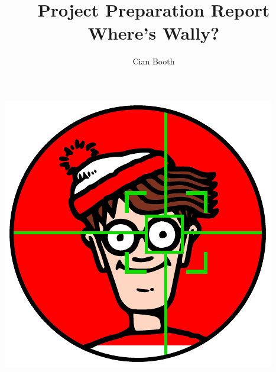 \documentclass[a4paper,12pt]{article}
\author{Cian Booth}
\title{Project Preparation Report\\ Where's Wally?}
\begin{document}
	\maketitle
  \begin{center}
    \includegraphics{wally}
  \end{center}
  \pagebreak
  \tableofcontents
  \pagebreak
  
  
\end{document}
